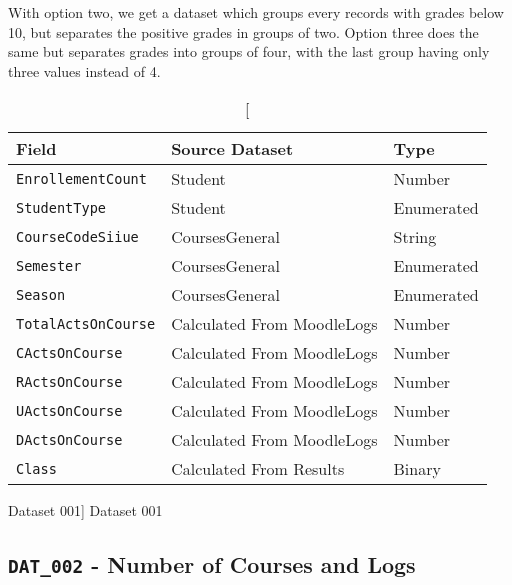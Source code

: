 With option two, we get a dataset which groups every records with grades below
10, but separates the positive grades in groups of two. Option three does the
same but separates grades into groups of four, with the last group having only
three values instead of 4.

\begin{table}[h!]
    \centering

    \begin{tabular}{| l | l | l |}
        \hline
        \textbf{Field}             & \textbf{Source Dataset}    & \textbf{Type} \\ \hline
        \texttt{EnrollementCount}  & Student                    & Number        \\ \hline
        \texttt{StudentType}       & Student                    & Enumerated    \\ \hline
        \texttt{CourseCodeSiiue}   & CoursesGeneral             & String        \\ \hline
        \texttt{Semester}          & CoursesGeneral             & Enumerated    \\ \hline
        \texttt{Season}            & CoursesGeneral             & Enumerated    \\ \hline
        \texttt{TotalActsOnCourse} & Calculated From MoodleLogs & Number        \\ \hline
        \texttt{CActsOnCourse}     & Calculated From MoodleLogs & Number        \\ \hline
        \texttt{RActsOnCourse}     & Calculated From MoodleLogs & Number        \\ \hline
        \texttt{UActsOnCourse}     & Calculated From MoodleLogs & Number        \\ \hline
        \texttt{DActsOnCourse}     & Calculated From MoodleLogs & Number        \\ \hline
        \texttt{Class}             & Calculated From Results    & Binary        \\ \hline
    \end{tabular}

    \caption
        [Dataset 001]
        {Dataset 001}

    \label{tab:dat_001}
\end{table}

\subsection{\texttt{DAT\_002} - Number of Courses and Logs}
\label{sec:dat_002}

